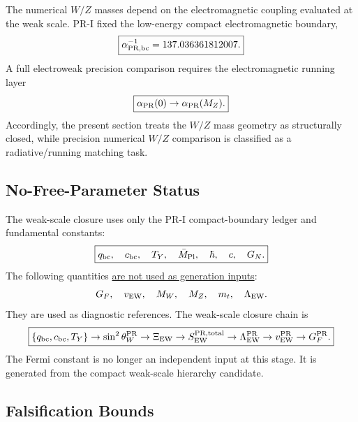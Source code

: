 \documentclass[11pt]{article}
\begin{document}
The numerical \(W/Z\) masses depend on the electromagnetic coupling evaluated at the weak scale. 
PR-I fixed the low-energy compact electromagnetic boundary,
\begin{equation}
\boxed{
\alpha_{\rm PR,bc}^{-1}
=
137.036361812007.
}
\end{equation}
A full electroweak precision comparison requires the electromagnetic running layer
\begin{equation}
\boxed{
\alpha_{\rm PR}(0)
\rightarrow
\alpha_{\rm PR}(M_Z).
}
\end{equation}
Accordingly, the present section treats the \(W/Z\) mass geometry as structurally closed, while precision numerical \(W/Z\) comparison is classified as a radiative/running matching task.

\subsection{No-Free-Parameter Status}
\label{sec:pr2_weak_scale_no_free_parameter_status}

The weak-scale closure uses only the PR-I compact-boundary ledger and fundamental constants:
\begin{equation}
\boxed{
q_{\rm bc},
\quad
c_{\rm bc},
\quad
T_Y,
\quad
\bar M_{\rm Pl},
\quad
\hbar,
\quad
c,
\quad
G_N.
}
\end{equation}
The following quantities \underline{are not used as generation inputs}:
\begin{equation}
G_F,
\quad
v_{\rm EW},
\quad
M_W,
\quad
M_Z,
\quad
m_t,
\quad
\Lambda_{\rm EW}.
\end{equation}
They are used as diagnostic references. The weak-scale closure chain is
\begin{equation}
\boxed{
\left\{
q_{\rm bc},
c_{\rm bc},
T_Y
\right\}
\rightarrow
\sin^2\theta_W^{\rm PR}
\rightarrow
\Xi_{\rm EW}
\rightarrow
S_{\rm EW}^{\rm PR,total}
\rightarrow
\Lambda_{\rm EW}^{\rm PR}
\rightarrow
v_{\rm EW}^{\rm PR}
\rightarrow
G_F^{\rm PR}.
}
\end{equation}
The Fermi constant is no longer an independent input at this stage. It is generated from the compact weak-scale hierarchy candidate.

\subsection{Falsification Bounds}
\label{sec:pr2_weak_scale_negative_controls}
\end{document}
